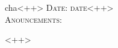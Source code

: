 \documentclass[a4paper,11pt,twoside]{report}
\begin{document}
cha<++>
\LARGE\textsc{Date: date<++>}
\\
\LARGE\textsc{Anouncements:}



\newpage
{}
<++>














\newpage
\end{document}
